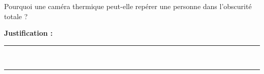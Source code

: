 Pourquoi une caméra thermique peut-elle repérer une personne dans l'obscurité totale ?

\choices

\noindent\textbf{Justification :} \hrulefill \\[2.5ex]
\rule{\linewidth}{0.4pt} \\[2.5ex]
\rule{\linewidth}{0.4pt}
\vfill
